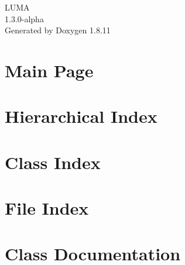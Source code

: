 \documentclass[twoside]{book}
\newcommand{\+}{\discretionary{\mbox{\scriptsize$\hookleftarrow$}}{}{}}
\newcommand{\clearemptydoublepage}{%
  \newpage{\pagestyle{empty}\cleardoublepage}%
}
\begin{document}
\hypersetup{pageanchor=false,
             bookmarksnumbered=true,
             pdfencoding=unicode
            }
\begin{titlepage}
\vspace*{7cm}
\begin{center}%
{\Large L\+U\+MA \\[1ex]\large 1.\+3.\+0-\/alpha }\\
\vspace*{1cm}
{\large Generated by Doxygen 1.8.11}\\
\end{center}
\end{titlepage}
\clearemptydoublepage
\tableofcontents
\clearemptydoublepage
{}
\hypersetup{pageanchor=true}

\chapter{Main Page}
\label{index}\hypertarget{index}{}
\chapter{Hierarchical Index}

\chapter{Class Index}

\chapter{File Index}

\chapter{Class Documentation}

















\end{document}
